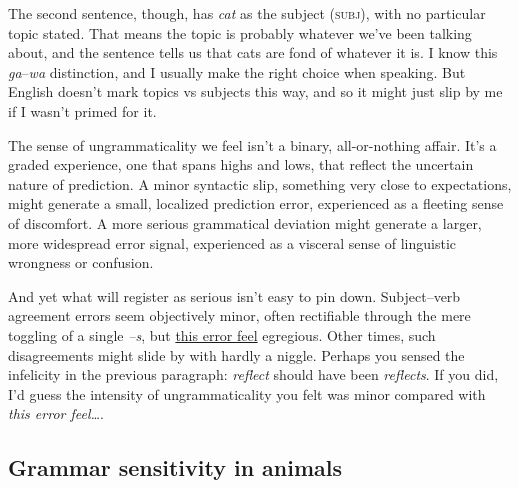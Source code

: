 \ea\label{ex:fond-of-cats}
    \z
\z

The second sentence, though, has \textit{cat} as the subject (\textsc{subj}), with no particular topic stated. That means the topic is probably whatever we've been talking about, and the sentence tells us that cats are fond of whatever it is. I know this \textit{ga}--\textit{wa} distinction, and I usually make the right choice when speaking. But English doesn't mark topics vs subjects this way, and so it might just slip by me if I wasn't primed for it.

\bigskip

The sense of ungrammaticality we feel isn't a binary, all-or-nothing affair. It's a graded experience, one that spans highs and lows, that reflect the uncertain nature of prediction. A minor syntactic slip, something very close to expectations, might generate a small, localized prediction error, experienced as a fleeting sense of discomfort. A more serious grammatical deviation might generate a larger, more widespread error signal, experienced as a visceral sense of linguistic wrongness or confusion.

And yet what will register as serious isn't easy to pin down. Subject--verb agreement errors seem objectively minor, often rectifiable through the mere toggling of a single \textit{--s}, but \uline{this error feel} egregious. Other times, such disagreements might slide by with hardly a niggle. Perhaps you sensed the infelicity in the previous paragraph: \textit{reflect} should have been \textit{reflects}. If you did, I'd guess the intensity of ungrammaticality you felt was minor compared with \textit{this error feel\dots}.

\subsection{Grammar sensitivity in animals}

